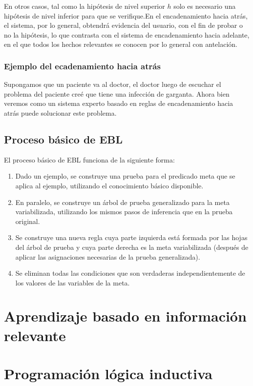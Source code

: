 \documentclass[12 pt, a4paper]{article}
\begin{document}
			En otros casos, tal como la hipótesis de nivel superior $h$ solo es necesario una hipótesis de nivel inferior para que se verifique.En el encadenamiento hacia atrás, el sistema, por lo general, obtendrá evidencia del usuario, con el fin de probar o no la hipótesis, lo que contrasta con el sistema de encadenamiento hacia adelante, en el que todos los hechos relevantes se conocen por lo general con antelación.
			\subsubsection{Ejemplo del ecadenamiento hacia atrás}
			Supongamos que un paciente va al doctor, el doctor luego de escuchar el problema del paciente creé que tiene una infección de garganta. Ahora bien veremos como un sistema experto basado en reglas de encadenamiento hacia atrás puede solucionar este problema.
			
			\subsection{Proceso básico de EBL}
			El proceso básico de EBL funciona de la siguiente forma:
				\begin{enumerate}
						\item Dado un ejemplo, se construye una prueba para el predicado meta que se aplica al ejemplo, utilizando el conocimiento básico disponible.\\
						  \item En paralelo, se construye un árbol de prueba generalizado para la meta variabilizada, utilizando los mismos pasos de inferencia que en la prueba original.\\
						  \item Se construye una nueva regla cuya parte izquierda está formada por las hojas del árbol de prueba y cuya parte derecha es la meta variabilizada (después de aplicar las asignaciones necesarias de la prueba generalizada).\\
						  \item Se eliminan todas las condiciones que son verdaderas independientemente de los valores de las variables de la meta.\\
				\end{enumerate}

	 \section{Aprendizaje basado en información relevante}
	
	 \section{Programación lógica inductiva}
	 
\end{document}
